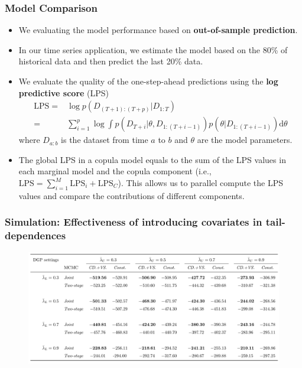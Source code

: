 \documentclass[10pt,aspectratio=43]{beamer}
\begin{document}
\begin{frame}
  \frametitle{Model Comparison}
  \begin{itemize}
  \item We evaluating the model performance based on \textbf{out-of-sample prediction}.
  \item In our time series application, we estimate the model based on the 80\% of
    historical data and then predict the last 20\% data.

  \item We evaluate the quality of the one-step-ahead predictions using the \textbf{log
      predictive score} (LPS) \citep{geweke2010comparing}
    \begin{align*}
      \mathrm{LPS}=&\log p(D_{(T+1):(T+p)}|D_{1:T})\\
      =&\sum\nolimits _{i=1}^{p}\log\int p(D_{T+i}|\theta,D_{1:(T+i-1)})p(\theta|D_{1:(T+i-1)})\mathrm{d}\theta
    \end{align*}
    where $D_{a:b}$ is the dataset from time $a$ to $b$ and $\theta$ are the model
    parameters.

  \item The global LPS in a copula model equals to the sum of the LPS values in each
    marginal model and the copula component (i.e.,
    $\mathrm{LPS}=\sum\nolimits _{i=1}^M \mathrm{LPS}_i + \mathrm{LPS}_C$). This allows us
    to parallel compute the LPS values and compare the contributions of different
    components.

  \end{itemize}
\end{frame}


\begin{frame}
  \frametitle{Simulation: Effectiveness of introducing covariates in tail-dependences}
  \begin{figure}[!h]
    \centering
    \includegraphics[width=1\textwidth]{Simulation-VS}
  \end{figure}
\end{frame}
\end{document}
